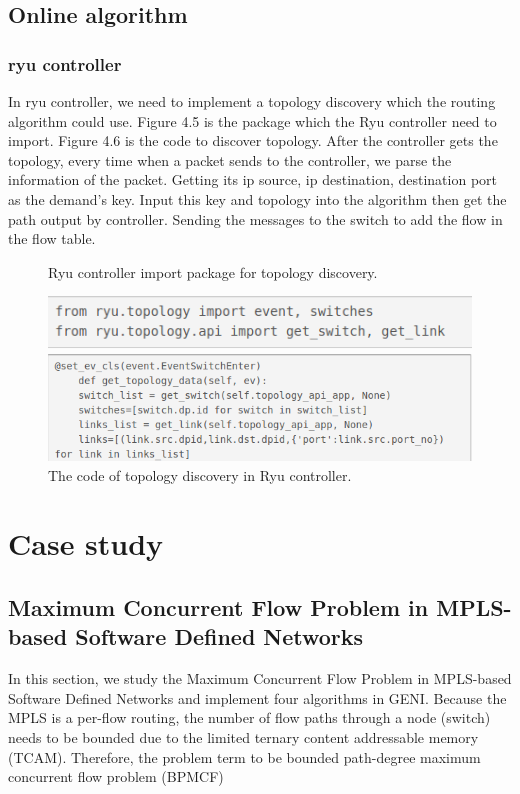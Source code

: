 \documentclass[a4paper,12pt]{report}
\begin{document}
\begin{large}
	 	\section{Online algorithm}
	 		\subsection{ryu controller}
	 		\qquad In ryu controller, we need to implement a topology discovery which the routing algorithm could use. Figure 4.5 is the package which the Ryu controller need to import. Figure 4.6 is the code to discover topology. After the controller gets the topology, every time when a packet sends to the controller, we parse the information of the packet. Getting its ip source, ip destination, destination port as the demand's key. Input this key and topology into the algorithm then get the path output by controller. Sending the messages to the switch to add the flow in the flow table.
	 		\begin{figure}
	          \caption{Ryu controller import package for topology discovery.}
	          \centering
	            \includegraphics[width=1.0\textwidth]{ryu_import.png}
	          \caption{The code of topology discovery in Ryu controller.}
	            \includegraphics[width=1.0\textwidth]{ryu_discovery.png}
	      	\end{figure}
  \chapter{Case study}
  \section{Maximum Concurrent Flow Problem in MPLS-based Software Defined Networks}
    \qquad In this section, we study the Maximum Concurrent Flow Problem in MPLS-based Software Defined Networks and implement four algorithms in GENI. Because the MPLS is a per-flow routing, the number of flow paths through a node (switch) needs to be bounded due to the limited ternary content addressable memory (TCAM). Therefore, the problem term to be bounded path-degree maximum concurrent flow problem (BPMCF)

\end{large}
\end{document}
